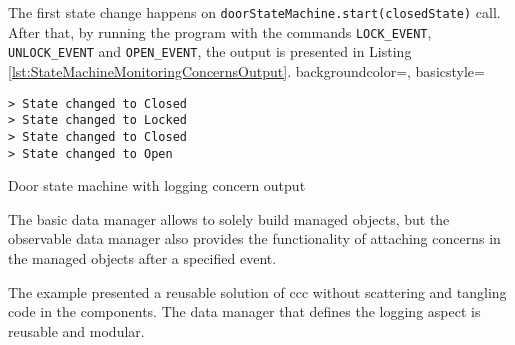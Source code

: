 The first state change happens on \texttt{doorStateMachine.start(closedState)} call.
After that, by running the program with the commands \texttt{LOCK\_EVENT}, \texttt{UNLOCK\_EVENT} and \texttt{OPEN\_EVENT}, the output is presented in Listing \ref{lst:StateMachineMonitoringConcernsOutput}.
 {
    backgroundcolor=\color{white},
    basicstyle=\scriptsize\color{black}\ttfamily
}

\begin{sourcecode} [H]
	\lstset{numbers=none}
	\begin{lstlisting}[style=Bash]
> State changed to Closed
> State changed to Locked
> State changed to Closed
> State changed to Open
	\end{lstlisting}
	\caption{Door state machine with logging concern output}
	\label{lst:StateMachineMonitoringConcernsOutput}
\end{sourcecode}

The basic data manager allows to solely build managed objects, but the observable data manager also provides the functionality of attaching concerns in the managed objects after a specified event.

The example presented a reusable solution of \ac{ccc} without scattering and tangling code in the components.
The data manager that defines the logging aspect is reusable and modular.




